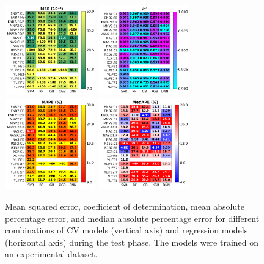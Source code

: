 \documentclass[10pt]{iopart}
\begin{document}
\begin{figure}
\centering
\includegraphics[width=0.35\textwidth]{Fig10a}
\includegraphics[width=0.35\textwidth]{Fig10b}
\includegraphics[width=0.35\textwidth]{Fig10c}
\includegraphics[width=0.35\textwidth]{Fig10d}
\caption{
Mean squared error, coefficient of determination, mean absolute percentage error, and median absolute percentage error
for different combinations of CV models (vertical axis) and regression models (horizontal axis)
during the test phase.
The models were trained on an experimental dataset.
}\label{Fig10}
\end{figure}
\end{document}
